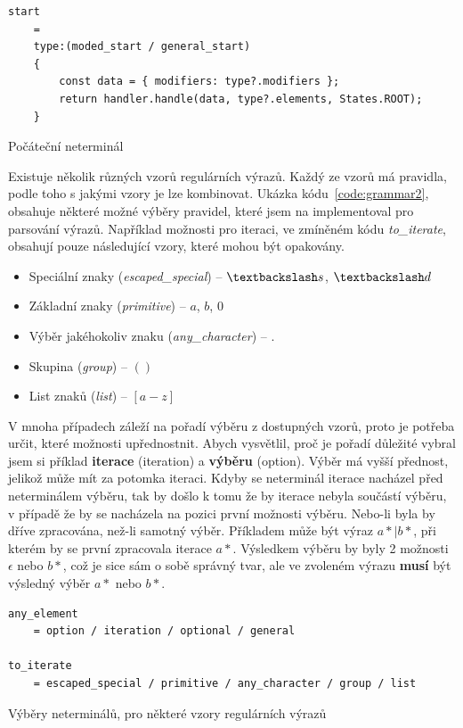 \begin{code}[!ht]
	\begin{verbatim}
start 
	= 
	type:(moded_start / general_start)
	{
		const data = { modifiers: type?.modifiers };
		return handler.handle(data, type?.elements, States.ROOT);
	}
	\end{verbatim}
	\caption{Počáteční neterminál}
	\label{code:grammar1}
\end{code}

Existuje několik různých vzorů regulárních výrazů.
Každý ze vzorů má pravidla, podle toho s jakými vzory je lze kombinovat.
Ukázka kódu~\ref{code:grammar2}, obsahuje některé možné výběry pravidel, které jsem na implementoval pro parsování výrazů.
Například možnosti pro iteraci, ve zmíněném kódu \textit{to\_iterate}, obsahují pouze následující vzory, které mohou být opakovány.

\begin{itemize}
	\item Speciální znaky (\textit{escaped\_special}) -- $\textbackslash s$, $\textbackslash d$
	\item Základní znaky (\textit{primitive}) -- $a$, $b$, $0$
	\item Výběr jakéhokoliv znaku (\textit{any\_character}) -- $.$
	\item Skupina (\textit{group}) -- $()$
	\item List znaků (\textit{list}) -- $[a-z]$
\end{itemize}

V mnoha případech záleží na pořadí výběru z dostupných vzorů, proto je potřeba určit, které možnosti upřednostnit.
Abych vysvětlil, proč je pořadí důležité vybral jsem si příklad \textbf{iterace} (iteration) a \textbf{výběru} (option).
Výběr má vyšší přednost, jelikož může mít za potomka iteraci.
Kdyby se neterminál iterace nacházel před neterminálem výběru, tak by došlo k tomu že by iterace nebyla součástí výběru, v případě že by se nacházela na pozici první možnosti výběru. 
Nebo-li byla by dříve zpracována, než-li samotný výběr.
Příkladem může být výraz $a*|b*$, při kterém by se první zpracovala iterace $a*$.
Výsledkem výběru by byly 2 možnosti $\epsilon$ nebo $b*$, což je sice sám o sobě správný tvar, ale ve zvoleném výrazu \textbf{musí} být výsledný výběr $a*$ nebo $b*$.

\begin{code}[!ht]
	\begin{verbatim}
any_element 
	= option / iteration / optional / general

to_iterate
	= escaped_special / primitive / any_character / group / list
	\end{verbatim}
	\caption{Výběry neterminálů, pro některé vzory regulárních výrazů}
	\label{code:grammar2}
\end{code}

